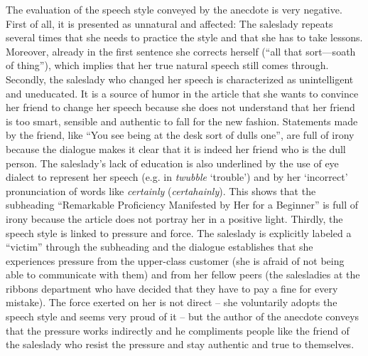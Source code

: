 The evaluation of the speech style conveyed by the anecdote is very negative. First of all, it is presented as unnatural and affected: The saleslady repeats several times that she needs to practice the style and that she has to take lessons. Moreover, already in the first sentence she corrects herself (“all that sort—soath of thing”), which implies that her true natural speech still comes through. Secondly, the saleslady who changed her speech is characterized as unintelligent and uneducated. It is a source of humor in the article that she wants to convince her friend to change her speech because she does not understand that her friend is too smart, sensible and authentic to fall for the new fashion. Statements made by the friend, like “You see being at the desk sort of dulls one”, are full of irony because the dialogue makes it clear that it is indeed her friend who is the dull person. The saleslady’s lack of education is also underlined by the use of eye dialect to represent her speech (e.g. in \emph{twubble} ‘trouble’) and by her ‘incorrect’ pronunciation of words like \emph{certainly} (\emph{certahainly}). This shows that the subheading “Remarkable Proficiency Manifested by Her for a Beginner” is full of irony because the article does not portray her in a positive light. Thirdly, the speech style is linked to pressure and force. The saleslady is explicitly labeled a “victim” through the subheading and the dialogue establishes that she experiences pressure from the upper-class customer (she is afraid of not being able to communicate with them) and from her fellow peers (the salesladies at the ribbons department who have decided that they have to pay a fine for every mistake). The force exerted on her is not direct – she voluntarily adopts the speech style and seems very proud of it – but the author of the anecdote conveys that the pressure works indirectly and he compliments people like the friend of the saleslady who resist the pressure and stay authentic and true to themselves.

